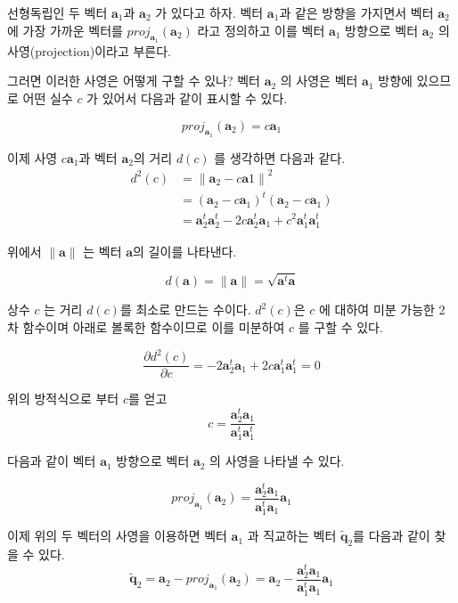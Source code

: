 \documentclass[
]{book}
\newcommand{\pardiff}[2]{\frac{\partial #1}{\partial #2 }}
\newcommand{\norm}[1]{\left\lVert#1\right\rVert}
\theoremstyle{definition}
\theoremstyle{definition}
\theoremstyle{definition}
\theoremstyle{definition}
\theoremstyle{remark}
\begin{document}
선형독립인 두 벡터 \(\bm a_1\)과 \(\bm a_2\) 가 있다고 하자. 벡터 \(\bm a_1\)과 같은 방향을 가지면서 벡터 \(\bm a_2\)에 가장 가까운 벡터를 \(proj_{\bm a_1} (\bm a_2)\) 라고 정의하고 이를 벡터 \(\bm a_1\) 방향으로 벡터 \(\bm a_2\) 의 사영(projection)이라고 부른다.

그러면 이러한 사영은 어떻게 구할 수 있나? 벡터 \(\bm a_2\) 의 사영은 벡터 \(\bm a_1\) 방향에 있으므로 어떤 실수 \(c\) 가 있어서 다음과 같이 표시할 수 있다.

\[ proj_{\bm a_1} (\bm a_2) =  c \bm a_1 \]

이제 사영 \(c \bm a_1\)과 벡터 \(\bm a_2\)의 거리 \(d(c)\) 를 생각하면 다음과 같다.
\begin{align*}
d^2(c) & = \norm{\bm a_2 - c \bm a1}^2 \\
   & = (\bm a_2 - c \bm a_1)^t(\bm a_2 - c \bm a_1) \\
   & = \bm a^t_2 \bm a^t_2 -2 c \bm a_2^t \bm a_1 + c^2 \bm a^t_1 \bm a^t_1
\end{align*}

위에서 \(\norm{\bm a}\) 는 벡터 \(\bm a\)의 길이를 나타낸다.

\[ d(\bm a) = \norm{\bm a} = \sqrt{\bm a^t \bm a} \]

상수 \(c\) 는 거리 \(d(c)\)를 최소로 만드는 수이다. \(d^2(c)\)은 \(c\) 에 대하여 미분 가능한 2차 함수이며 아래로 볼록한 함수이므로 이를 미분하여 \(c\) 를 구할 수 있다.

\[ \pardiff{d^2(c)}{c} = - 2\bm a_2^t \bm a_1 + 2c \bm a^t_1 \bm a^t_1 =0 \]

위의 방적식으로 부터 \(c\)를 얻고
\[ c= \frac{\bm a_2^t \bm a_1  }{\bm a^t_1 \bm a^t_1} \]

다음과 같이 벡터 \(\bm a_1\) 방향으로 벡터 \(\bm a_2\) 의 사영을 나타낼 수 있다.

\begin{equation} 
proj_{\bm a_1} (\bm a_2) = \frac{ \bm a_2^t \bm a_1} {\bm a_1^t \bm a_1} \bm a_1
\label{eq:proj1}
\end{equation}

이제 위의 두 벡터의 사영을 이용하면 벡터 \(\bm a_1\) 과 직교하는 벡터 \(\tilde {\bm q}_2\)를 다음과 같이 찾을 수 있다.
\[ \tilde {\bm q}_2 = \bm a_2 - proj_{\bm a_1} (\bm a_2) = \bm a_2 -  \frac{\bm a_2^t \bm a_1} {\bm a_1^t \bm a_1} \bm a_1 \]
\end{document}
